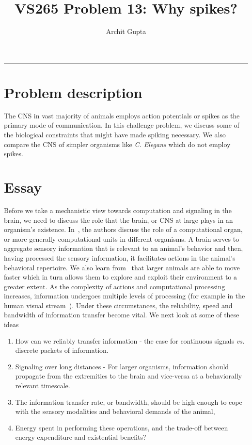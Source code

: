 \documentclass[10pt,onecolumn]{article}
\title{VS265 Problem 13: Why spikes?}
\author{Archit Gupta}
\date{}
\begin{document}
    \maketitle
    \vspace{-2em}
    \noindent\rule{\textwidth}{1.4pt}
    \vspace{1em}

    \section*{Problem description}
    \label{sec:problem_description}

    The \ac{CNS} in vast majority of animals employs action potentials or spikes as the primary mode of communication.
    In this challenge problem, we discuss some of the biological constraints that might have made spiking necessary.
    We also compare the \ac{CNS} of simpler organisms like \textit{C. Elegans} which do not employ spikes.

    \section*{Essay}
    \label{sec:essay}

    Before we take a mechanistic view towards computation and signaling in the brain, we need to discuss the role that the brain, or \ac{CNS} at large plays in an organism's existence.
    In~\cite{sterling2015principles}, the authors discuss the role of a computational organ, or more generally computational units in different organisms.
    A brain serves to aggregate sensory information that is relevant to an animal's behavior and then, having processed the sensory information, it facilitates actions in the animal's behavioral repertoire.
    We also learn from~\cite{sterling2015principles} that larger animals are able to move faster which in turn allows them to explore and exploit their environment to a greater extent.
    As the complexity of actions and computational processing increases, information undergoes multiple levels of processing (for example in the human visual stream~\cite{felleman1991distributed}).
    Under these circumstances, the reliability, speed and bandwidth of information transfer become vital.
    We next look at some of these ideas
    \begin{enumerate}
        \item How can we reliably transfer information - the case for continuous signals \textit{vs.} discrete packets of information.
        \item Signaling over long distances - For larger organisms, information should propagate from the extremities to the brain and vice-versa at a behaviorally relevant timescale.
        \item The information transfer rate, or bandwidth, should be high enough to cope with the sensory modalities and behavioral demands of the animal,
        \item Energy spent in performing these operations, and the trade-off between energy expenditure and existential benefits?
    \end{enumerate}
\end{document}
